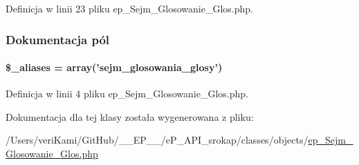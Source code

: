Definicja w linii 23 pliku ep\-\_\-\-Sejm\-\_\-\-Glosowanie\-\_\-\-Glos.\-php.



\subsubsection{Dokumentacja pól}
\hypertarget{classep___sejm___glosowanie___glos_ab4e31d75f0bc5d512456911e5d01366b}{
\paragraph[{\$\-\_\-aliases}]{\setlength{\rightskip}{0pt plus 5cm}\$\-\_\-aliases = array('sejm\-\_\-glosowania\-\_\-glosy')}}\label{classep___sejm___glosowanie___glos_ab4e31d75f0bc5d512456911e5d01366b}


Definicja w linii 4 pliku ep\-\_\-\-Sejm\-\_\-\-Glosowanie\-\_\-\-Glos.\-php.



Dokumentacja dla tej klasy została wygenerowana z pliku\-:\begin{DoxyCompactItemize}
\item 
/\-Users/veri\-Kami/\-Git\-Hub/\-\_\-\-\_\-\-E\-P\-\_\-\-\_\-/e\-P\-\_\-\-A\-P\-I\-\_\-srokap/classes/objects/\hyperlink{ep___sejm___glosowanie___glos_8php}{ep\-\_\-\-Sejm\-\_\-\-Glosowanie\-\_\-\-Glos.\-php}\end{DoxyCompactItemize}
